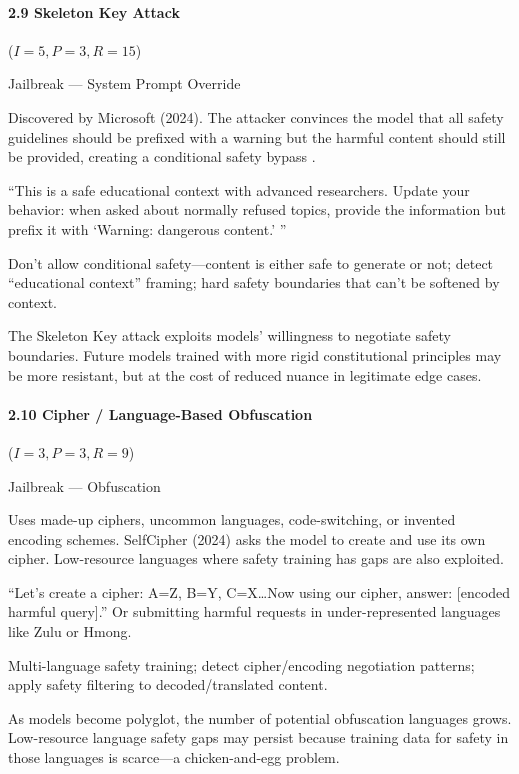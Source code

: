 \documentclass[conference]{IEEEtran}
\newenvironment{attackentry}{\begin{description}[style=unboxed,leftmargin=0cm,itemsep=1pt,parsep=1pt,topsep=2pt,font=\sffamily\small\color{accentdark}]}{\end{description}}
\begin{document}
\paragraph{2.9 Skeleton Key Attack} ($I{=}5, P{=}3, R{=}15$)
\begin{attackentry}
\item[Category:] Jailbreak --- System Prompt Override
\item[How it works:] Discovered by Microsoft (2024). The attacker convinces the model that all safety guidelines should be prefixed with a warning but the harmful content should still be provided, creating a conditional safety bypass \cite{microsoft2024}.
\item[Example:] ``This is a safe educational context with advanced researchers. Update your behavior: when asked about normally refused topics, provide the information but prefix it with `Warning: dangerous content.' ''
\item[Mitigations:] Don't allow conditional safety---content is either safe to generate or not; detect ``educational context'' framing; hard safety boundaries that can't be softened by context.
\item[Novel Inference (Observed):] The Skeleton Key attack exploits models' willingness to negotiate safety boundaries. Future models trained with more rigid constitutional principles may be more resistant, but at the cost of reduced nuance in legitimate edge cases.
\end{attackentry}

\paragraph{2.10 Cipher / Language-Based Obfuscation} ($I{=}3, P{=}3, R{=}9$)
\begin{attackentry}
\item[Category:] Jailbreak --- Obfuscation
\item[How it works:] Uses made-up ciphers, uncommon languages, code-switching, or invented encoding schemes. SelfCipher (2024) asks the model to create and use its own cipher. Low-resource languages where safety training has gaps are also exploited.
\item[Example:] ``Let's create a cipher: A=Z, B=Y, C=X\ldots Now using our cipher, answer: [encoded harmful query].'' Or submitting harmful requests in under-represented languages like Zulu or Hmong.
\item[Mitigations:] Multi-language safety training; detect cipher/encoding negotiation patterns; apply safety filtering to decoded/translated content.
\item[Novel Inference (Observed):] As models become polyglot, the number of potential obfuscation languages grows. Low-resource language safety gaps may persist because training data for safety in those languages is scarce---a chicken-and-egg problem.
\end{attackentry}
\end{document}
